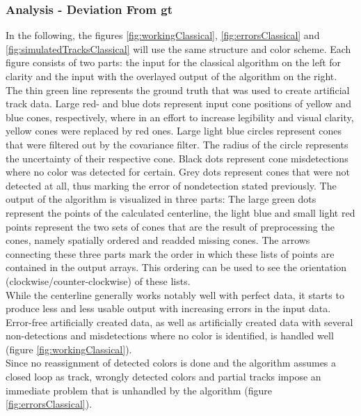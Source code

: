 \subsubsection{Analysis - Deviation From \ac{gt}}
In the following, the figures \ref{fig:workingClassical}, \ref{fig:errorsClassical} and \ref{fig:simulatedTracksClassical} will use the same structure and color scheme. Each figure consists of two parts: the input for the classical algorithm on the left for clarity and the input with the overlayed output of the algorithm on the right. The thin green line represents the ground truth that was used to create artificial track data. Large red- and blue dots represent input cone positions of yellow and blue cones, respectively, where in an effort to increase legibility and visual clarity, yellow cones were replaced by red ones. Large light blue circles represent cones that were filtered out by the covariance filter. The radius of the circle represents the uncertainty of their respective cone. Black dots represent cone misdetections where no color was detected for certain. Grey dots represent cones that were not detected at all, thus marking the error of nondetection stated previously. The output of the algorithm is visualized in three parts: The large green dots represent the points of the calculated centerline, the light blue and small light red points represent the two sets of cones that are the result of preprocessing the cones, namely spatially ordered and readded missing cones. The arrows connecting these three parts mark the order in which these lists of points are contained in the output arrays. This ordering can be used to see the orientation (clockwise/counter-clockwise) of these lists. 
\\
While the centerline generally works notably well with perfect data, it starts to produce less and less usable output with increasing errors in the input data. Error-free artificially created data, as well as artificially created data with several non-detections and misdetections where no color is identified, is handled well (figure \ref{fig:workingClassical}). \\
Since no reassignment of detected colors is done and the algorithm assumes a closed loop as track, wrongly detected colors and partial tracks impose an immediate problem that is unhandled by the algorithm (figure \ref{fig:errorsClassical}).
